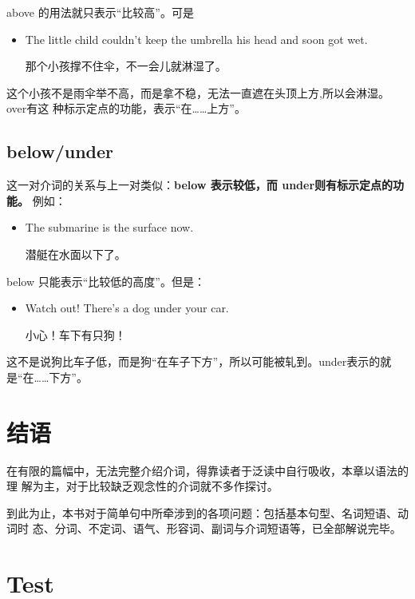 above 的用法就只表示“比较高”。可是
\begin{itemize}
\item The little child couldn't keep the umbrella  his head and soon got
  wet.

  那个小孩撑不住伞，不一会儿就淋湿了。
\end{itemize}
这个小孩不是雨伞举不高，而是拿不稳，无法一直遮在头顶上方,所以会淋湿。over有这
种标示定点的功能，表示“在……上方”。

\subsection{below/under}

这一对介词的关系与上一对类似：\textbf{below 表示较低，而 under则有标示定点的功能。}
例如：
\begin{itemize}
\item  The submarine is  the surface now.

  潜艇在水面以下了。
\end{itemize}

below 只能表示“比较低的高度”。但是：
\begin{itemize}
\item  Watch out! There's a dog under your car.

  小心！车下有只狗！
\end{itemize}
这不是说狗比车子低，而是狗“在车子下方”，所以可能被轧到。under表示的就
是“在……下方”。

\section{结语}

在有限的篇幅中，无法完整介绍介词，得靠读者于泛读中自行吸收，本章以语法的理
解为主，对于比较缺乏观念性的介词就不多作探讨。

到此为止，本书对于简单句中所牵涉到的各项问题：包括基本句型、名词短语、动词时
态、分词、不定词、语气、形容词、副词与介词短语等，已全部解说完毕。

\section{Test}

